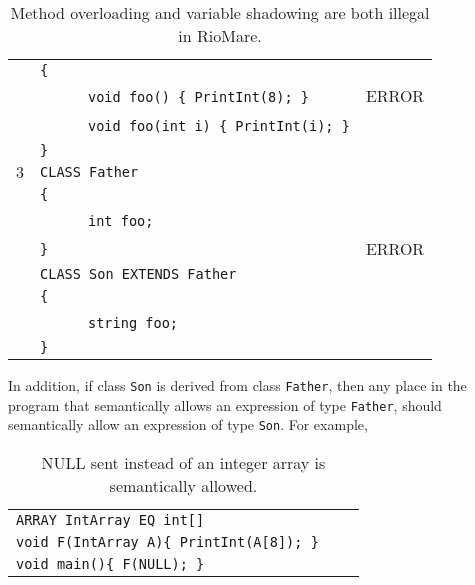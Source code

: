 \documentclass{article}
\begin{document}
\begin{table}[h]
\begin{tabular}{|l|l|l|}
     & \verb"{"                                       &       \\
     & ~ ~ ~ ~\verb"void foo() { PrintInt(8); }"      & ERROR \\
     & ~ ~ ~ ~\verb"void foo(int i) { PrintInt(i); }" &       \\
     & \verb"}"                                       &       \\
\hline
 $3$ & \verb"CLASS Father"             &       \\
     & \verb"{"                        &       \\
     & ~ ~ ~ ~\verb"int foo;"          &       \\
     & \verb"}"                        & ERROR \\
     & \verb"CLASS Son EXTENDS Father" &       \\
     & \verb"{"                        &       \\
     & ~ ~ ~ ~\verb"string foo;"       &       \\
     & \verb"}"                        &       \\
\hline
\end{tabular}
\caption{Method overloading and variable shadowing are both illegal in RioMare.
\label{Table_Code_Examples_Overload_Override}}
\end{table}
\newpage
In addition, if class \verb"Son" is derived from class \verb"Father",
then any place in the program that semantically allows an expression of type \verb"Father",
should semantically allow an expression of type \verb"Son". For example,
\begin{table}[h]
\centering
\begin{tabular}{ l l l }
\verb"ARRAY IntArray EQ int[]" \\
\verb"void F(IntArray A){ PrintInt(A[8]); }" \\
\verb"void main(){ F(NULL); }" \\
\end{tabular}
\caption{NULL sent instead of an integer array is semantically allowed.
\label{Table_Code_Examples_NULL_Instead_Of_Any_Class}}
\end{table}
\end{document}
